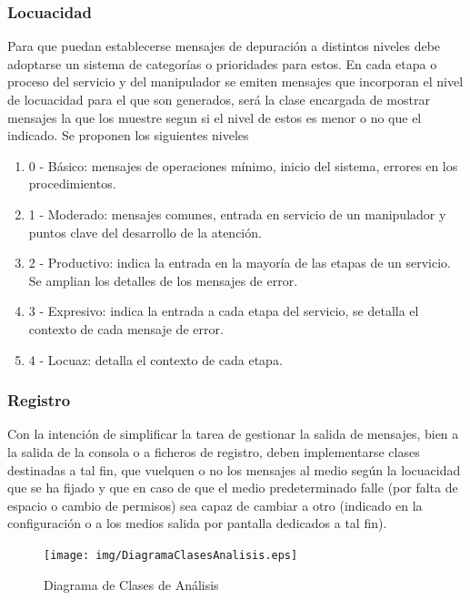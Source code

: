 \documentclass[a4paper,spanish,12pt]{book}
\begin{document}
\subsubsection{Locuacidad}
Para que puedan establecerse mensajes de depuración a distintos niveles debe adoptarse un sistema de categorías o prioridades para estos. En cada etapa o proceso del servicio y del manipulador se emiten mensajes que incorporan el nivel de locuacidad para el que son generados, será la clase encargada de mostrar mensajes la que los muestre segun si el nivel de estos es menor o no que el indicado.
Se proponen los siguientes niveles
\begin{enumerate}
	\item 0 - Básico: mensajes de operaciones mínimo, inicio del sistema, errores en los procedimientos.
	\item 1 - Moderado: mensajes comunes, entrada en servicio de un manipulador y puntos clave del desarrollo de la atención.
	\item 2 - Productivo: indica la entrada en la mayoría de las etapas de un servicio. Se amplian los detalles de los mensajes de error.
	\item 3 - Expresivo: indica la entrada a cada etapa del servicio, se detalla el contexto de cada mensaje de error.
	\item 4 - Locuaz: detalla el contexto de cada etapa.
\end{enumerate}

\subsubsection{Registro}
Con la intención de simplificar la tarea de gestionar la salida de mensajes, bien a la salida de la consola o a ficheros de registro, deben implementarse clases destinadas a tal fin, que vuelquen o no los mensajes al medio según la locuacidad que se ha fijado y que en caso de que el medio predeterminado falle (por falta de espacio o cambio de permisos) sea capaz de cambiar a otro (indicado en la configuración o a los medios salida por pantalla dedicados a tal fin).


\begin{figure}[h]
	\texttt{[image: img/DiagramaClasesAnalisis.eps]}
              \caption{Diagrama de Clases de Análisis}
     \label{fig:DiagramaClasesAnalisis}
\end{figure}
\end{document}

